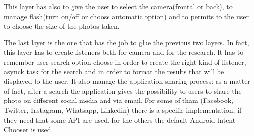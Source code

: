 This layer has also to give the user to select the camera(frontal or back), to 
manage flash(turn on/off or choose automatic option) and to permits to the user 
to choose the size of the photos taken.

The last layer is the one that has the job to glue the previous two layers. In 
fact, this layer has to create listeners both for camera and for the research. 
It has to remember user search option choose in order to create the right kind 
of listener, asynck task for the search and in order to format the results that 
will be displayed to the user. It also manage the application sharing process: 
as a matter of fact, after a search the application gives the possibility to 
users to share the photo on different social media and via email. For some of 
tham (Facebook, Twitter, Instagram, Whatsapp, Linkedin) there is a specific 
implementation, if they need that some API are used, for the others the default 
Android Intent Chooser is used. 